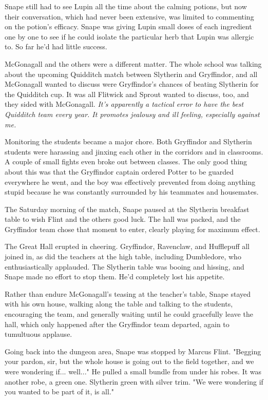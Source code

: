 Snape still had to see Lupin all the time about the calming potions, but now their conversation, which had never been extensive, was limited to commenting on the potion's efficacy. Snape was giving Lupin small doses of each ingredient one by one to see if he could isolate the particular herb that Lupin was allergic to. So far he'd had little success.

McGonagall and the others were a different matter. The whole school was talking about the upcoming Quidditch match between Slytherin and Gryffindor, and all McGonagall wanted to discuss were Gryffindor's chances of beating Slytherin for the Quidditch cup. It was all Flitwick and Sprout wanted to discuss, too, and they sided with McGonagall. \emph{It's apparently a tactical error to have the best Quidditch team every year. It promotes jealousy and ill feeling, especially against me.}

Monitoring the students became a major chore. Both Gryffindor and Slytherin students were harassing and jinxing each other in the corridors and in classrooms. A couple of small fights even broke out between classes. The only good thing about this was that the Gryffindor captain ordered Potter to be guarded everywhere he went, and the boy was effectively prevented from doing anything stupid because he was constantly surrounded by his teammates and housemates.

The Saturday morning of the match, Snape paused at the Slytherin breakfast table to wish Flint and the others good luck. The hall was packed, and the Gryffindor team chose that moment to enter, clearly playing for maximum effect.

The Great Hall erupted in cheering. Gryffindor, Ravenclaw, and Hufflepuff all joined in, as did the teachers at the high table, including Dumbledore, who enthusiastically applauded. The Slytherin table was booing and hissing, and Snape made no effort to stop them. He'd completely lost his appetite.

Rather than endure McGonagall's teasing at the teacher's table, Snape stayed with his own house, walking along the table and talking to the students, encouraging the team, and generally waiting until he could gracefully leave the hall, which only happened after the Gryffindor team departed, again to tumultuous applause.

Going back into the dungeon area, Snape was stopped by Marcus Flint. "Begging your pardon, sir, but the whole house is going out to the field together, and we were wondering if... well..." He pulled a small bundle from under his robes. It was another robe, a green one. Slytherin green with silver trim. "We were wondering if you wanted to be part of it, is all."

